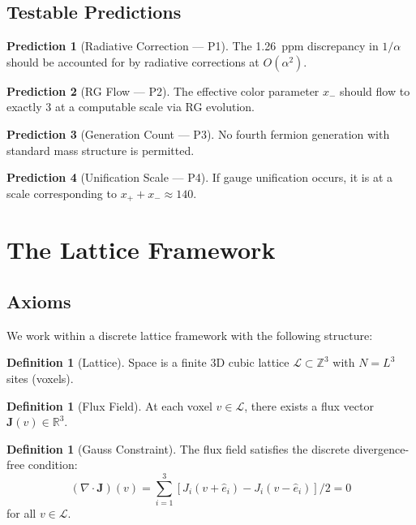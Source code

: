 \documentclass[11pt,a4paper]{article}
\theoremstyle{definition}
\newtheorem{definition}[theorem]{Definition}
\newtheorem{prediction}{Prediction}
\theoremstyle{remark}
\newcommand{\Zthree}{\mathbb{Z}^3}
\newcommand{\Rthree}{\mathbb{R}^3}
\begin{document}
\subsection{Testable Predictions}

\begin{prediction}[Radiative Correction --- P1]
The 1.26~ppm discrepancy in $1/\alpha$ should be accounted for by radiative corrections at $O(\alpha^2)$.
\end{prediction}

\begin{prediction}[RG Flow --- P2]
The effective color parameter $x_-$ should flow to exactly 3 at a computable scale via RG evolution.
\end{prediction}

\begin{prediction}[Generation Count --- P3]
No fourth fermion generation with standard mass structure is permitted.
\end{prediction}

\begin{prediction}[Unification Scale --- P4]
If gauge unification occurs, it is at a scale corresponding to $x_+ + x_- \approx 140$.
\end{prediction}

\section{The Lattice Framework}

\subsection{Axioms}

We work within a discrete lattice framework with the following structure:

\begin{definition}[Lattice]
Space is a finite 3D cubic lattice $\mathcal{L} \subset \Zthree$ with $N = L^3$ sites (voxels).
\end{definition}

\begin{definition}[Flux Field]
At each voxel $v \in \mathcal{L}$, there exists a flux vector $\mathbf{J}(v) \in \Rthree$.
\end{definition}

\begin{definition}[Gauss Constraint]
The flux field satisfies the discrete divergence-free condition:
\begin{equation}
    (\nabla \cdot \mathbf{J})(v) = \sum_{i=1}^{3} \left[ J_i(v + \hat{e}_i) - J_i(v - \hat{e}_i) \right] / 2 = 0
\end{equation}
for all $v \in \mathcal{L}$.
\end{definition}
\end{document}
